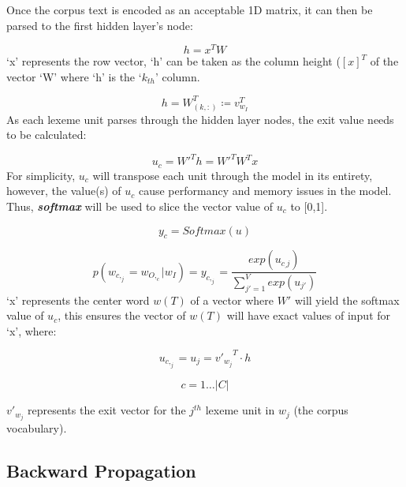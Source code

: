 Once the corpus text is encoded as an acceptable 1D matrix, it can then be parsed to the first hidden layer's node:

\begin{equation}
    h = x^T W
\end{equation}
`x' represents the row vector, `h' can be taken as the column height ($[x]^T$ of the vector `W' where `h' is the `$k_{th}$' column.

\begin{equation}
    h = W_{(k,:)}^{T} \coloneqq v_{w_I}^{T}
\end{equation}
As each lexeme unit parses through the hidden layer nodes, the exit value needs to be calculated:

\begin{equation} \label{eq:u_cDefinition}
    u_{c} = W'^{T}h = W'^{T} W^{T}x
\end{equation}
For simplicity, $u_{c}$ will transpose each unit through the model in its entirety, however, the value(s) of $u_{c}$ cause performancy and memory issues in the model. Thus, \textbf{\textit{softmax}} will be used to slice the vector value of $u_{c}$ to [0,1].

\begin{equation*}
    y_{c} = Softmax(u)
\end{equation*}

\begin{equation}
    p(w_{c,_j} = w_{O,_c} | w_{I}) = y_{c,_j} = \frac{exp(u_{c_,j})}{\sum_{j' = 1}^{V} exp(u_{j'})}
\end{equation}
`x' represents the center word $w(T)$ of a vector where $W'$ will yield the softmax value of $u_{c}$, this ensures the vector of $w(T)$ will have exact values of input for `x', where:

\begin{multicols}{2}
    \begin{equation*}
        u_{c,_j} = u_{j} = {v'_{w_j}} ^ T \cdot h
    \end{equation*}

    \begin{equation}
        c=1 \ldots |C|
    \end{equation}
\end{multicols}
${v'_{w_j}}$ represents the exit vector for the $j^{th}$ lexeme unit in $w_{j}$ (the corpus vocabulary).

\subsection{Backward Propagation}

